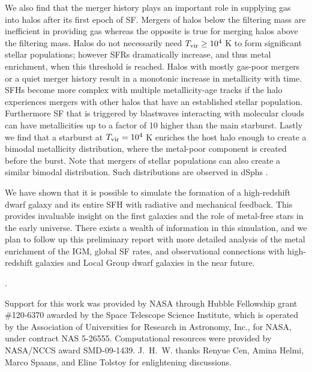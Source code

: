 \documentclass[12pt]{article}
\newcommand{\tvir}{\ifmmode{T_{\rm{vir}}}\else{$T_{\rm{vir}}$}\fi}
\newcounter{lastnote}
\newenvironment{scilastnote}{%
\setcounter{lastnote}{\value{enumiv}}%
\addtocounter{lastnote}{+1}%
\begin{list}%
{\arabic{lastnote}.}
{\setlength{\leftmargin}{.22in}}
{\setlength{\labelsep}{.5em}}}
{\end{list}}
\begin{document}
We also find that the merger history plays an important role in
supplying gas into halos after its first epoch of SF.  Mergers of
halos below the filtering mass are inefficient in providing gas
whereas the opposite is true for merging halos above the filtering
mass.  Halos do not necessarily need $\tvir \ge 10^4$ K to form
significant stellar populations; however SFRs dramatically increase,
and thus metal enrichment, when this threshold is reached.  Halos with
mostly gas-poor mergers or a quiet merger history result in a
monotonic increase in metallicity with time.  SFHs become more complex
with multiple metallicity-age tracks if the halo experiences mergers
with other halos that have an established stellar population.
Furthermore SF that is triggered by blastwaves interacting with
molecular clouds can have metallicities up to a factor of 10 higher
than the main starburst.  Lastly we find that a starburst at $\tvir =
10^4$ K enriches the host halo enough to create a bimodal metallicity
distribution, where the metal-poor component is created before the
burst.  Note that mergers of stellar populations can also create a
similar bimodal distribution.  Such distributions are observed in
dSphs \cite{Battaglia10}.

We have shown that it is possible to simulate the formation of a
high-redshift dwarf galaxy and its entire SFH with radiative and
mechanical feedback.  This provides invaluable insight on the first
galaxies and the role of metal-free stars in the early universe.
There exists a wealth of information in this simulation, and we plan
to follow up this preliminary report with more detailed analysis of
the metal enrichment of the IGM, global SF rates, and observational
connections with high-redshift galaxies and Local Group dwarf galaxies
in the near future.





\begin{scilastnote}
\item Support for this work was provided by NASA through Hubble Fellowship
grant \#120-6370 awarded by the Space Telescope Science Institute,
which is operated by the Association of Universities for Research in
Astronomy, Inc., for NASA, under contract NAS 5-26555.  Computational
resources were provided by NASA/NCCS award SMD-09-1439.
J.~H.~W. thanks Renyue Cen, Amina Helmi, Marco Spaans, and Eline
Tolstoy for enlightening discussions.
\end{scilastnote}
\end{document}

